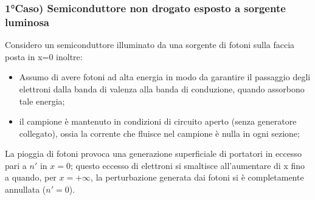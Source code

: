 \subsubsection*{1°Caso) Semiconduttore non drogato esposto a sorgente luminosa}
Considero un semiconduttore illuminato da una sorgente di fotoni sulla faccia posta in x=0 inoltre:
\begin{itemize}
    \item Assumo di avere fotoni ad alta energia in modo da garantire il passaggio degli elettroni dalla banda di valenza alla banda di conduzione, quando assorbono tale energia;
    \item il campione è mantenuto in condizioni di circuito aperto (senza generatore collegato), ossia la corrente che fluisce nel campione è nulla in ogni sezione;
\end{itemize}
%
La pioggia di fotoni provoca una generazione superficiale di portatori in eccesso pari a $n'$ in $x=0$; questo eccesso di elettroni si smaltisce all'aumentare di x fino a quando, per $x=+\infty$, la perturbazione generata dai fotoni si è completamente annullata ($n'=0$).\\

